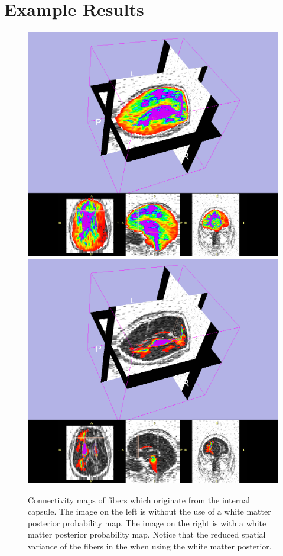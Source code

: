 \chapter{Example Results}
\begin{figure} \label{fig:singlecmaps}
	\includegraphics[width=0.5\linewidth]{slicer-0022}
	\includegraphics[width=0.5\linewidth]{slicer-0020}
	\caption{Connectivity maps of fibers which originate from the internal capsule.  The image on the left is without the use of a white matter posterior probability map.  The image on the right is with a white matter posterior probability map.  Notice that the reduced spatial variance of the fibers in the when using the white matter posterior.}
\end{figure}

